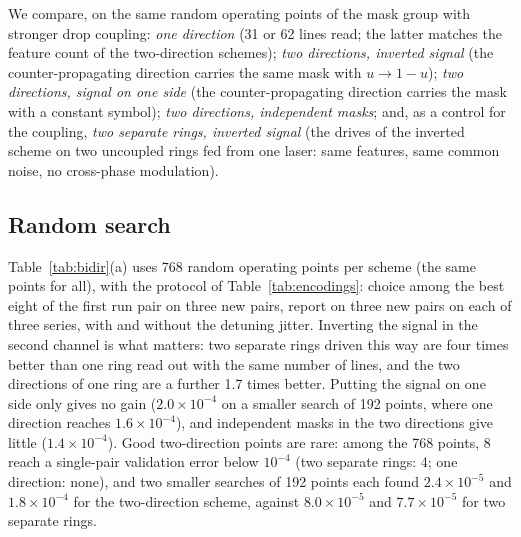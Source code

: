 We compare, on the same random operating points of the mask group with stronger drop coupling:
\emph{one direction} (31 or 62 lines read; the latter matches the feature count of the two-direction schemes);
\emph{two directions, inverted signal} (the counter-propagating direction carries the same mask with $u\to1-u$);
\emph{two directions, signal on one side} (the counter-propagating direction carries the mask with a constant symbol);
\emph{two directions, independent masks}; and, as a control for the coupling, \emph{two separate rings, inverted signal} (the drives
of the inverted scheme on two uncoupled rings fed from one laser: same features, same common noise, no cross-phase modulation).

\subsection{Random search}

Table~\ref{tab:bidir}(a) uses 768 random operating points per scheme (the same points for all), with the protocol of
Table~\ref{tab:encodings}: choice among the best eight of the first run pair on three new pairs, report on three new pairs on each of
three series, with and without the detuning jitter. Inverting the signal in the second channel is what matters: two separate rings
driven this way are four times better than one ring read out with the same number of lines, and the two directions of one ring are a
further 1.7 times better. Putting the signal on one side only gives no gain ($2.0\times10^{-4}$ on a smaller search of 192 points,
where one direction reaches $1.6\times10^{-4}$), and independent masks in the two directions give little ($1.4\times10^{-4}$). Good
two-direction points are rare: among the 768 points, 8 reach a single-pair validation error below $10^{-4}$ (two separate rings: 4;
one direction: none), and two smaller searches of 192 points each found $2.4\times10^{-5}$ and $1.8\times10^{-4}$ for the
two-direction scheme, against $8.0\times10^{-5}$ and $7.7\times10^{-5}$ for two separate rings.

